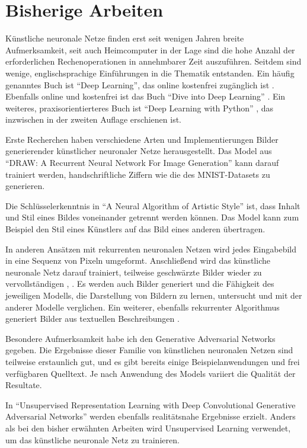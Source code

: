 \section{Bisherige Arbeiten}
\label{sec:related}
Künstliche neuronale Netze finden erst seit wenigen Jahren breite Aufmerksamkeit, seit auch Heimcomputer in der Lage sind die hohe Anzahl der erforderlichen Rechenoperationen in annehmbarer Zeit auszuführen. Seitdem sind wenige, englischsprachige Einführungen in die Thematik entstanden. Ein häufig genanntes Buch ist ``Deep Learning'', das online kostenfrei zugänglich ist \cite{goodfellow2016deeplearning}. Ebenfalls online und kostenfrei ist das Buch ``Dive into Deep Learning'' \cite{zhang2020dive}. Ein weiteres, praxisorientierteres Buch ist ``Deep Learning with Python'' \cite{chollet2021deep}, das inzwischen in der zweiten Auflage erschienen ist.

Erste Recherchen haben verschiedene Arten und Implementierungen Bilder generierender künstlicher neuronaler Netze herausgestellt. Das Model aus ``DRAW: A Recurrent Neural Network For Image Generation'' \cite{gregor2015draw} kann darauf trainiert werden, handschriftliche Ziffern wie die des MNIST-Datasets \cite{deng2012mnist} zu generieren.

Die Schlüsselerkenntnis in ``A Neural Algorithm of Artistic Style'' \cite{gatys2015nst} ist, dass Inhalt und Stil eines Bildes voneinander getrennt werden können. Das Model kann zum Beispiel den Stil eines Künstlers auf das Bild eines anderen übertragen.

In anderen Ansätzen mit rekurrenten neuronalen Netzen wird jedes Eingabebild in eine Sequenz von Pixeln umgeformt. Anschließend wird das künstliche neuronale Netz darauf trainiert, teilweise geschwärzte Bilder wieder zu vervollständigen \cite{chen2020generative}, \cite{oord2016pixel}. Es werden auch Bilder generiert und die Fähigkeit des jeweiligen Modells, die Darstellung von Bildern zu lernen, untersucht und mit der anderer Modelle verglichen. Ein weiterer, ebenfalls rekurrenter Algorithmus generiert Bilder aus textuellen Beschreibungen \cite{ramesh2021zeroshot}.

Besondere Aufmerksamkeit habe ich den Generative Adversarial Networks \cite{goodfellow2014generative} gegeben. Die Ergebnisse dieser Familie von künstlichen neuronalen Netzen sind teilweise erstaunlich gut, und es gibt bereits einige Beispielanwendungen und frei verfügbaren Quelltext. Je nach Anwendung des Models variiert die Qualität der Resultate.

In ``Unsupervised Representation Learning with Deep Convolutional Generative Adversarial Networks'' \cite{radford2016unsupervised} werden ebenfalls
realitätsnahe Ergebnisse erzielt. Anders als bei den bisher erwähnten Arbeiten
wird Unsupervised Learning verwendet, um das künstliche neuronale Netz zu trainieren.

